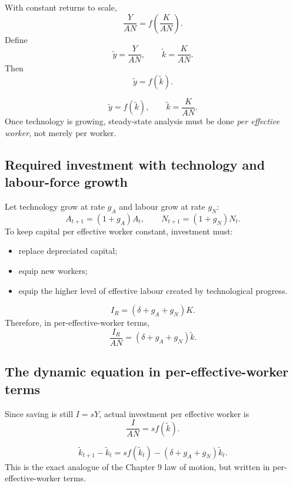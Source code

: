 \documentclass[12pt]{article}
\begin{document}
With constant returns to scale,
\[
\frac{Y}{AN}=f\!\left(\frac{K}{AN}\right).
\]
Define
\[
\tilde{y}=\frac{Y}{AN},
\qquad
\tilde{k}=\frac{K}{AN}.
\]
Then
\[
\tilde{y}=f(\tilde{k}).
\]

\begin{keyformula}[title={Key Formula: The right unit of analysis}]
\[
\tilde{y}=f(\tilde{k}),
\qquad
\tilde{k}=\frac{K}{AN}.
\]
Once technology is growing, steady-state analysis must be done \emph{per effective worker}, not merely per worker.
\end{keyformula}

\subsection{Required investment with technology and labour-force growth}

Let technology grow at rate \(g_A\) and labour grow at rate \(g_N\):
\[
A_{t+1}=(1+g_A)A_t,
\qquad
N_{t+1}=(1+g_N)N_t.
\]
To keep capital per effective worker constant, investment must:
\begin{itemize}[leftmargin=1.5em]
\item replace depreciated capital;
\item equip new workers;
\item equip the higher level of effective labour created by technological progress.
\end{itemize}

\begin{keyformula}[title={Key Formula: Required investment}]
\[
I_R=(\delta+g_A+g_N)K.
\]
Therefore, in per-effective-worker terms,
\[
\frac{I_R}{AN}=(\delta+g_A+g_N)\tilde{k}.
\]
\end{keyformula}

\subsection{The dynamic equation in per-effective-worker terms}

Since saving is still \(I=sY\), actual investment per effective worker is
\[
\frac{I}{AN}=s f(\tilde{k}).
\]

\begin{keyformula}[title={Key Formula: Law of motion with technological progress}]
\[
\tilde{k}_{t+1}-\tilde{k}_t=s f(\tilde{k}_t)-(\delta+g_A+g_N)\tilde{k}_t.
\]
This is the exact analogue of the Chapter 9 law of motion, but written in per-effective-worker terms.
\end{keyformula}
\end{document}
